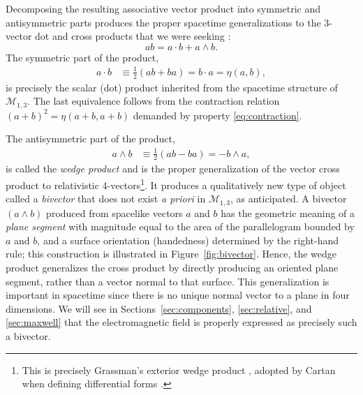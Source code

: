 \documentclass[1p,sort&compress]{elsarticle}
\numberwithin{equation}{section}
\begin{document}
Decomposing the resulting associative vector product into symmetric and antisymmetric parts produces the proper spacetime generalizations to the 3-vector dot and cross products that we were seeking \cite{Clifford1878}:
\begin{equation}\label{eq:product}
  ab = a\cdot b + a\wedge b.
\end{equation}
The symmetric part of the product,
\begin{align}
  \label{eq:dot}
a\cdot b &\equiv \frac{1}{2}(ab + ba) = b \cdot a = \eta(a,b),
\end{align}
is precisely the scalar (dot) product inherited from the spacetime structure of $\mathcal{M}_{1,3}$.  The last equivalence follows from the contraction relation $(a + b)^2 = \eta(a+b,a+b)$ demanded by property \eqref{eq:contraction}.  

The antisymmetric part of the product,
\begin{align}
  \label{eq:wedge}
  a\wedge b &\equiv \frac{1}{2}(ab - ba) = - b \wedge a,
\end{align}
is called the \emph{wedge product} and is the proper generalization of the vector cross product to relativistic 4-vectors\footnote{This is precisely Grassman's exterior wedge product \cite{Grassmann1844}, adopted by Cartan when defining differential forms \cite{Cartan1899}.}.  It produces a qualitatively new type of object called a \emph{bivector} that does not exist \emph{a priori} in $\mathcal{M}_{1,3}$, as anticipated.  A bivector $(a\wedge b)$ produced from spacelike vectors $a$ and $b$ has the geometric meaning of a \emph{plane segment} with magnitude equal to the area of the parallelogram bounded by $a$ and $b$, and a surface orientation (handedness) determined by the right-hand rule; this construction is illustrated in Figure~\ref{fig:bivector}.  Hence, the wedge product generalizes the cross product by directly producing an oriented plane segment, rather than a vector normal to that surface.  This generalization is important in spacetime since there is no unique normal vector to a plane in four dimensions.  We will see in Sections~\ref{sec:components}, \ref{sec:relative}, and \ref{sec:maxwell} that the electromagnetic field is properly expressed as precisely such a bivector.
\end{document}
